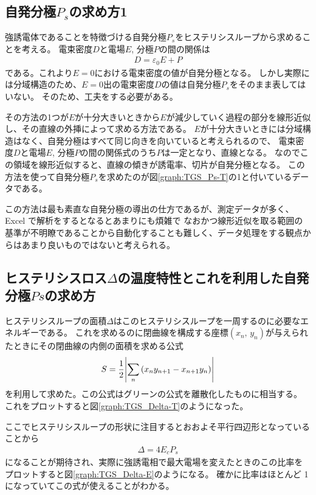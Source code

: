 \documentclass[11pt,dvipdfmx,a4paper]{jsarticle}
\begin{document}
\subsection{自発分極\(P_s\)の求め方1}
強誘電体であることを特徴づける自発分極\(P_s\)をヒステリシスループから求めることを考える。
電束密度\(D\)と電場\(E\), 分極\(P\)の間の関係は
\begin{align}
    D = \varepsilon_0 E + P
\end{align}
である。これより\(E=0\)における電束密度の値が自発分極となる。
しかし実際には分域構造のため、\(E=0\)出の電束密度\(D\)の値は自発分極\(P_s\)をそのまま表してはいない。
そのため、工夫をする必要がある。

その方法の1つが\(E\)が十分大きいときから\(E\)が減少していく過程の部分を線形近似し、その直線の外挿によって求める方法である。
\(E\)が十分大きいときには分域構造はなく、自発分極はすべて同じ向きを向いていると考えられるので、
電束密度\(D\)と電場\(E\), 分極\(P\)の間の関係式のうち\(P\)は一定となり、直線となる。
なのでこの領域を線形近似すると、直線の傾きが誘電率、切片が自発分極となる。
この方法を使って自発分極\(P_s\)を求めたのが図\ref{graph:TGS_Ps-T}の1と付いているデータである。

この方法は最も素直な自発分極の導出の仕方であるが、測定データが多く、Excel で解析をするとなるとあまりにも煩雑で
なおかつ線形近似を取る範囲の基準が不明瞭であることから自動化することも難しく、データ処理をする観点からはあまり良いものではないと考えられる。

\subsection{ヒステリシスロス\(\Delta\)の温度特性とこれを利用した自発分極\(Ps\)の求め方}
ヒステリシスループの面積\(\Delta\)はこのヒステリシスループを一周するのに必要なエネルギーである。
これを求めるのに閉曲線を構成する座標\((x_n,\,y_n)\)が与えられたときにその閉曲線の内側の面積を求める公式
\begin{align}
    S = \frac{1}{2}\abs{\sum_n \qty(x_n y_{n+1} - x_{n+1}y_n)}
\end{align}
を利用して求めた。この公式はグリーンの公式を離散化したものに相当する。
これをプロットすると図\ref{graph:TGS_Delta-T}のようになった。

ここでヒステリシスループの形状に注目するとおおよそ平行四辺形となっていることから
\begin{align}
    \Delta = 4 E_c P_s
\end{align}
になることが期待され、実際に強誘電相で最大電場を変えたときのこの比率をプロットすると図\ref{graph:TGS_Delta-E}のようになる。
確かに比率はほとんど 1 になっていてこの式が使えることがわかる。
\end{document}
